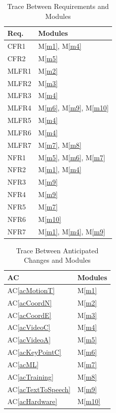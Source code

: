 \documentclass[12pt, titlepage]{article}
\newcommand{\acref}[1]{AC\ref{#1}}
\newcommand{\mref}[1]{M\ref{#1}}
\begin{document}
\begin{table}[H]
\centering
\begin{tabular}{p{} p{}}
\toprule
\textbf{Req.} & \textbf{Modules}\\
\midrule
CFR1 & \mref{m1}, \mref{m4}\\
CFR2 & \mref{m5}\\
MLFR1 & \mref{m2}\\
MLFR2 & \mref{m3}\\
MLFR3 & \mref{m4}\\
MLFR4 & \mref{m6}, \mref{m9}, \mref{m10}\\
MLFR5 & \mref{m4}\\
MLFR6 & \mref{m4}\\
MLFR7 & \mref{m7}, \mref{m8}\\
NFR1 & \mref{m5}, \mref{m6}, \mref{m7}\\
NFR2 & \mref{m1}, \mref{m4}\\
NFR3 & \mref{m9}\\
NFR4 & \mref{m9}\\
NFR5 & \mref{m7}\\
NFR6 & \mref{m10}\\
NFR7 & \mref{m1}, \mref{m4}, \mref{m9}\\

\bottomrule
\end{tabular}
\caption{Trace Between Requirements and Modules}
\label{TblRT}
\end{table}

\begin{table}[H]
\centering
\begin{tabular}{p{} p{}}
\toprule
\textbf{AC} & \textbf{Modules}\\
\midrule
\acref{acMotionT} & \mref{m1}\\
\acref{acCoordN} & \mref{m2}\\
\acref{acCoordE} & \mref{m3}\\
\acref{acVideoC} & \mref{m4}\\
\acref{acVideoA} & \mref{m5}\\
\acref{acKeyPointC} & \mref{m6}\\
\acref{acML} & \mref{m7}\\
\acref{acTraining} & \mref{m8}\\
\acref{acTextToSpeech} & \mref{m9}\\
\acref{acHardware} & \mref{m10}\\





\bottomrule
\end{tabular}
\caption{Trace Between Anticipated Changes and Modules}
\label{TblACT}
\end{table}
\end{document}
